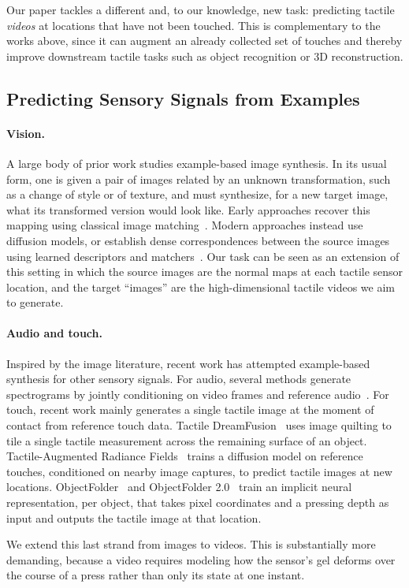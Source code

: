 Our paper tackles a different and, to our knowledge, new task: predicting tactile \emph{videos} at
locations that have not been touched. This is complementary to the works above, since it can
augment an already collected set of touches and thereby improve downstream tactile tasks such as
object recognition or 3D reconstruction.

\subsection{Predicting Sensory Signals from Examples}

\paragraph{Vision.}
A large body of prior work studies example-based image synthesis. In its usual form, one is given
a pair of images related by an unknown transformation, such as a change of style or of texture,
and must synthesize, for a new target image, what its transformed version would look like. Early
approaches recover this mapping using classical image matching~\cite{imageanalogies,patchmatch}.
Modern approaches instead use diffusion models, or establish dense correspondences between the
source images using learned descriptors and
matchers~\cite{ldm,lightglue,asic}. Our task can be seen as an extension of this
setting in which the source images are the normal maps at each tactile sensor location, and the
target ``images'' are the high-dimensional tactile videos we aim to generate.

\paragraph{Audio and touch.}
Inspired by the image literature, recent work has attempted example-based synthesis for other
sensory signals. For audio, several methods generate spectrograms by jointly conditioning on
video frames and reference audio~\cite{foleyanalogies,foleycrafter,audiotextureanalogy}. For
touch, recent work mainly generates a single tactile image at the moment of contact from
reference touch data. Tactile DreamFusion~\cite{tactiledreamfusion} uses image quilting to tile a
single tactile measurement across the remaining surface of an object. Tactile-Augmented Radiance
Fields~\cite{tarf} trains a diffusion model on reference touches, conditioned on nearby image
captures, to predict tactile images at new locations. ObjectFolder~\cite{objectfolder} and
ObjectFolder 2.0~\cite{objectfolder2} train an implicit neural representation, per object, that
takes pixel coordinates and a pressing depth as input and outputs the tactile image at that
location.

We extend this last strand from images to videos. This is substantially more demanding, because a
video requires modeling how the sensor's gel deforms over the course of a press rather than only
its state at one instant.
